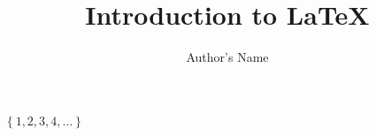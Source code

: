\documentclass{article}
\begin{document}
\title{Introduction to \LaTeX{}}
\author{Author's Name}

\maketitle

$\left\{ 1, 2, 3, 4, ... \right\}$ 
\end{document}

